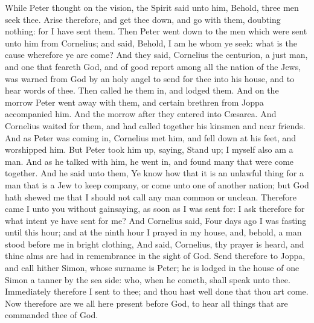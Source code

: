  While Peter thought on the vision, the Spirit said unto
him, Behold, three men seek thee.  Arise therefore, and get
thee down, and go with them, doubting nothing: for I have sent them.
 Then Peter went down to the men which were sent unto him
from Cornelius; and said, Behold, I am he whom ye seek: what is the
cause wherefore ye are come?  And they said, Cornelius the
centurion, a just man, and one that feareth God, and of good report
among all the nation of the Jews, was warned from God by an holy angel
to send for thee into his house, and to hear words of thee.
 Then called he them in, and lodged them. And on the morrow
Peter went away with them, and certain brethren from Joppa accompanied
him.  And the morrow after they entered into Cæsarea. And
Cornelius waited for them, and had called together his kinsmen and near
friends.  And as Peter was coming in, Cornelius met him,
and fell down at his feet, and worshipped him.  But Peter
took him up, saying, Stand up; I myself also am a man.  And
as he talked with him, he went in, and found many that were come
together.  And he said unto them, Ye know how that it is an
unlawful thing for a man that is a Jew to keep company, or come unto one
of another nation; but God hath shewed me that I should not call any man
common or unclean.  Therefore came I unto you without
gainsaying, as soon as I was sent for: I ask therefore for what intent
ye have sent for me?  And Cornelius said, Four days ago I
was fasting until this hour; and at the ninth hour I prayed in my house,
and, behold, a man stood before me in bright clothing,  And
said, Cornelius, thy prayer is heard, and thine alms are had in
remembrance in the sight of God.  Send therefore to Joppa,
and call hither Simon, whose surname is Peter; he is lodged in the house
of one Simon a tanner by the sea side: who, when he cometh, shall speak
unto thee.  Immediately therefore I sent to thee; and thou
hast well done that thou art come. Now therefore are we all here present
before God, to hear all things that are commanded thee of God.

